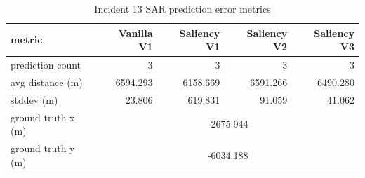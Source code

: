 \begin{table}[ht]
\centering
\caption{Incident 13 SAR prediction error metrics}
\label{tab:sar-incident-13}
\begin{tabular}{lrrrr}
\hline
metric & Vanilla V1 & Saliency V1 & Saliency V2 & Saliency V3 \\
\hline
prediction count & 3 & 3 & 3 & 3 \\
avg distance (m) & 6594.293 & 6158.669 & 6591.266 & 6490.280 \\
stddev (m) & 23.806 & 619.831 & 91.059 & 41.062 \\
ground truth x (m) & \multicolumn{4}{c}{-2675.944} \\
ground truth y (m) & \multicolumn{4}{c}{-6034.188} \\
\hline
\end{tabular}
\end{table}
